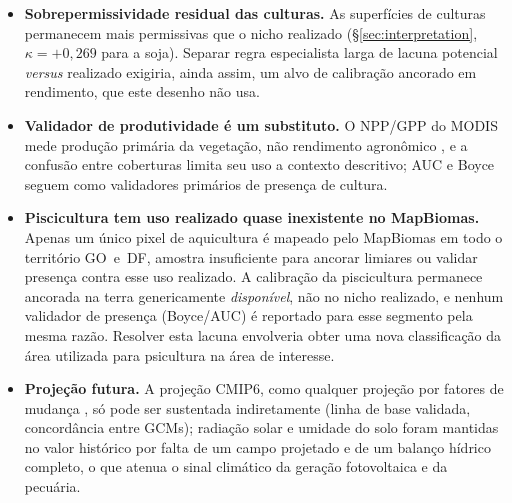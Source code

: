 \begin{itemize}
    (\S\ref{sec:atlas-present}). Essa leitura, porém, simplifica demais se aplicada por
    \emph{prefixo de origem do dado} em vez de por \emph{papel temático}: na decomposição por
    fator agregada por tema (Figura~\ref{fig:factor-variance}), o clima explica em média 0,13 da
    variância territorial, mas essa média esconde dois extremos --- a irradiância solar
    (\texttt{clim\_srad}, 0,36) é um sinal climático espacial genuíno, enquanto o fator
    nominalmente ``climático'' que domina a pecuária (\texttt{clim\_soil\_moist}, 0,58) descreve
    armazenamento de água no solo, não um gradiente climático; reclassificado pelo papel
    temático, a parcela de terreno+solo da pecuária sobe de 0,42 para 1,00. A nomenclatura de
    origem do dado não deve, portanto, ser confundida com o papel temático da variável: é a
    padronização (\S\ref{sec:fuzzy-standard}) e a agregação por fator que definem o que conta
    como ``clima'', não o catálogo de onde a banda vem.
  \item \textbf{Sobrepermissividade residual das culturas.} As superfícies de culturas
    permanecem mais permissivas que o nicho realizado (\S\ref{sec:interpretation},
    $\kappa=+0{,}269$ para a soja). Separar regra especialista larga de lacuna potencial
    \emph{versus} realizado exigiria, ainda assim, um alvo de calibração ancorado em rendimento,
    que este desenho não usa.
  \item \textbf{Validador de produtividade é um substituto.} O NPP/GPP do MODIS mede produção
    primária da vegetação, não rendimento agronômico \citep{turner_evaluation_2006,he_regional_2018}, e a confusão
    entre coberturas limita seu uso a contexto descritivo; AUC e Boyce seguem como validadores
    primários de presença de cultura.
  \item \textbf{Piscicultura tem uso realizado quase inexistente no MapBiomas.} Apenas um 
    único pixel de aquicultura é mapeado pelo MapBiomas em todo o território GO~e~DF, 
    amostra insuficiente para ancorar limiares ou validar presença contra esse uso realizado. 
    A calibração da piscicultura permanece ancorada na terra genericamente \emph{disponível}, 
    não no nicho realizado, e nenhum validador de presença (Boyce/AUC) é
    reportado para esse segmento pela mesma razão. Resolver esta lacuna envolveria obter uma
    nova classificação da área utilizada para psicultura na área de interesse.
  \item \textbf{Projeção futura.} A projeção CMIP6, como qualquer
    projeção por fatores de mudança \citep{ramirez-villegas_downscaling_2010,hay_comparison_2000}, só pode ser sustentada
    indiretamente (linha de base validada, concordância entre GCMs); radiação solar e umidade do
    solo foram mantidas no valor histórico por falta de um campo projetado e de um balanço
    hídrico completo, o que atenua o sinal climático da geração fotovoltaica e da pecuária.
\end{itemize}

